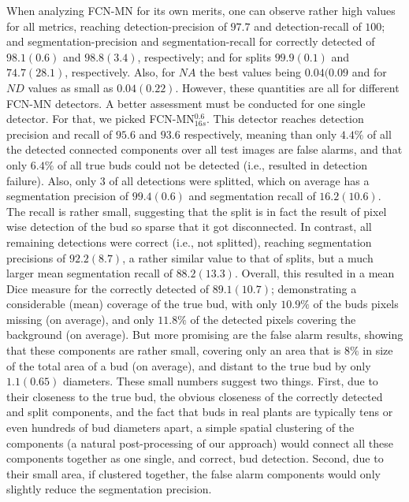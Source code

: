 \documentclass[a4paper,authoryear,review]{elsarticle}
\begin{document}
When analyzing FCN-MN for its own merits, one can observe rather high values for all metrics, reaching detection-precision of $97.7$ and detection-recall of $100$; and segmentation-precision and segmentation-recall for correctly detected of $98.1(0.6)$ and $98.8(3.4)$, respectively; and for splits $99.9(0.1)$ and $74.7(28.1)$, respectively. Also, for $NA$ the best values being $0.04(0.09$ and for $ND$ values as small as $0.04 (0.22)$.  
%
However, these quantities are all for different FCN-MN detectors. A better assessment must 
be conducted for one single detector. For that, we picked FCN-MN$_{16s}^{0.6}$. This detector reaches detection precision and recall of $95.6$ and $93.6$ respectively, meaning than only $4.4\%$ of all the detected connected components over all test images are false alarms, and that only $6.4\%$ of all true buds could not be detected (i.e., resulted in detection failure).
%
Also, only $3$ of all detections were splitted, which on average has a segmentation precision of $99.4(0.6)$ and segmentation recall of $16.2(10.6)$. The recall is rather small, suggesting that the split is in fact the result of  pixel wise detection of the bud so sparse that it got disconnected. In contrast, all remaining detections were correct (i.e., not splitted), reaching segmentation precisions of $92.2(8.7)$, a rather similar value to that of splits, but a much larger mean segmentation recall of $88.2(13.3)$. Overall, this resulted in a mean Dice measure for the correctly detected of $89.1(10.7)$; demonstrating a considerable (mean) coverage of the true bud, with only $10.9 \%$ of the buds pixels missing (on average), and only $11.8\%$ of the detected pixels covering the background (on average). 
%
But more promising are the false alarm results, showing that these components are rather small, covering only an area that is $8\%$ in size of the total area of a bud (on average), and distant to the true bud by only $1.1 (0.65)$ diameters. These small numbers suggest two things. First, due to their closeness to the true bud, the obvious closeness of the correctly detected and split components, and the fact that buds in real plants are typically tens or even hundreds of bud diameters apart, a simple spatial clustering of the components (a natural post-processing of our approach) would connect all these components together as one single, and correct, bud detection. Second, due to their small area, if clustered together, the false alarm components would only slightly reduce the segmentation precision. 
\end{document}
